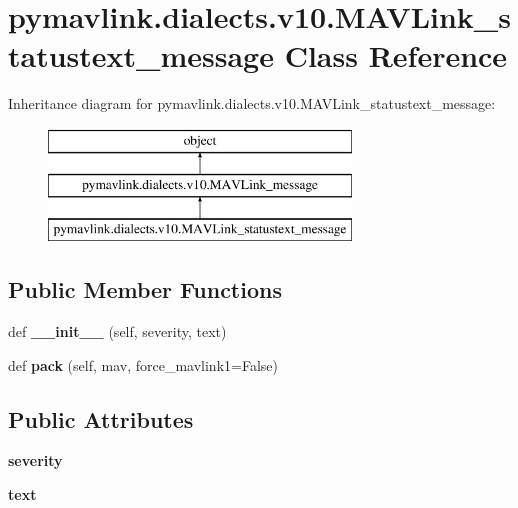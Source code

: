 \hypertarget{classpymavlink_1_1dialects_1_1v10_1_1MAVLink__statustext__message}{}\section{pymavlink.\+dialects.\+v10.\+M\+A\+V\+Link\+\_\+statustext\+\_\+message Class Reference}
\label{classpymavlink_1_1dialects_1_1v10_1_1MAVLink__statustext__message}
Inheritance diagram for pymavlink.\+dialects.\+v10.\+M\+A\+V\+Link\+\_\+statustext\+\_\+message\+:\begin{figure}[H]
\begin{center}
\leavevmode
\includegraphics[height=3.000000cm]{classpymavlink_1_1dialects_1_1v10_1_1MAVLink__statustext__message}
\end{center}
\end{figure}
\subsection*{Public Member Functions}
\begin{DoxyCompactItemize}
\item 
\mbox{\label{classpymavlink_1_1dialects_1_1v10_1_1MAVLink__statustext__message_adee5f54ee3f10e2bee3063167cd3a04e}} 
def {\bfseries \+\_\+\+\_\+init\+\_\+\+\_\+} (self, severity, text)
\item 
\mbox{\label{classpymavlink_1_1dialects_1_1v10_1_1MAVLink__statustext__message_aadb16dbd515172725b3428c4f3dba6dc}} 
def {\bfseries pack} (self, mav, force\+\_\+mavlink1=False)
\end{DoxyCompactItemize}
\subsection*{Public Attributes}
\begin{DoxyCompactItemize}
\item 
\mbox{\label{classpymavlink_1_1dialects_1_1v10_1_1MAVLink__statustext__message_ac38d689c9f7be54f3f8847d899274f0d}} 
{\bfseries severity}
\item 
\mbox{\label{classpymavlink_1_1dialects_1_1v10_1_1MAVLink__statustext__message_a37f0ee386e8cc0455522e342457538e7}} 
{\bfseries text}
\end{DoxyCompactItemize}
